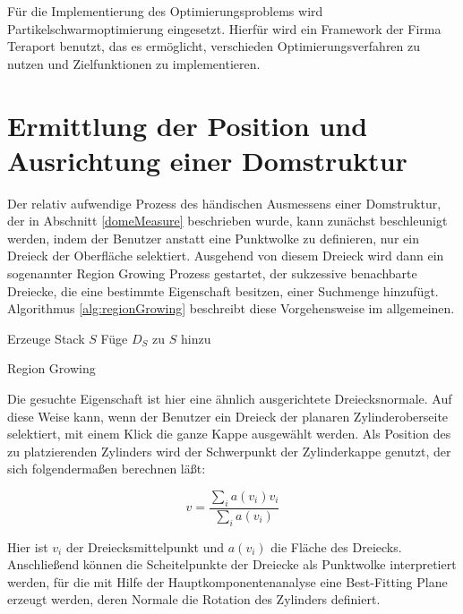 F\"ur die Implementierung des Optimierungsproblems wird Partikelschwarmoptimierung eingesetzt. Hierf\"ur wird ein Framework der Firma Teraport benutzt, das es erm\"oglicht, verschieden Optimierungsverfahren zu nutzen und Zielfunktionen zu implementieren.

\section{Ermittlung der Position und Ausrichtung einer Domstruktur}
\label{posTrafo}

Der relativ aufwendige Prozess des h\"andischen Ausmessens einer Domstruktur, der in Abschnitt \ref{domeMeasure} beschrieben wurde, kann zun\"achst beschleunigt werden, indem der Benutzer anstatt eine Punktwolke zu definieren, nur ein Dreieck der Oberfläche selektiert. Ausgehend von diesem Dreieck wird dann ein sogenannter Region Growing Prozess gestartet, der sukzessive benachbarte Dreiecke, die eine bestimmte Eigenschaft besitzen, einer Suchmenge hinzuf\"ugt.
Algorithmus \ref{alg:regionGrowing} beschreibt diese Vorgehensweise im allgemeinen.

\begin{algorithm}[H]
 \SetLine %
 Erzeuge Stack $S$\;
 Füge $D_{S}$ zu $S$ hinzu\;
 \caption{Region Growing}
 \label{alg:regionGrowing}
\end{algorithm}

Die gesuchte Eigenschaft ist hier eine \"ahnlich ausgerichtete Dreiecksnormale. Auf diese Weise kann, wenn der Benutzer ein Dreieck der planaren Zylinderoberseite selektiert, mit einem Klick die ganze Kappe ausgew\"ahlt werden.
Als Position des zu platzierenden Zylinders wird der Schwerpunkt der Zylinderkappe genutzt, der sich folgenderma{\ss}en berechnen l\"a{\ss}t:

\begin{equation}
v=\frac{\sum_{i}  a(v_{i})v_{i}}{\sum_{i}  a(v_{i})}
\end{equation}

Hier ist $v_{i}$ der Dreiecksmittelpunkt und  $a(v_{i})$ die Fläche des Dreiecks. Anschlie{\ss}end können die Scheitelpunkte der Dreiecke als Punktwolke interpretiert werden, f\"ur die mit Hilfe der Hauptkomponentenanalyse eine Best-Fitting Plane erzeugt werden, deren Normale die Rotation des Zylinders definiert. 

